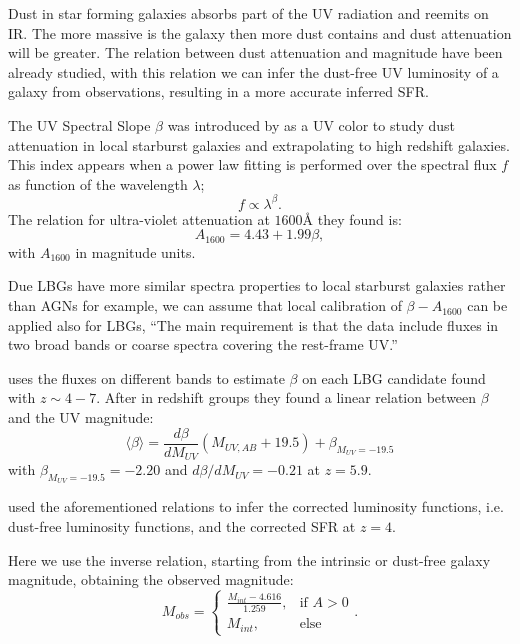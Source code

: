 \documentclass{emulateapj}
\begin{document}
Dust in star forming galaxies absorbs part of the UV radiation and reemits on IR. The more 
massive is the galaxy then more dust contains and dust attenuation will be greater. The 
relation between dust attenuation and magnitude have been already studied, with this relation 
we can infer the dust-free UV luminosity of a galaxy from observations, resulting in  a more 
accurate inferred SFR.

The UV Spectral Slope $\beta$ was introduced by \citet{Meurer99} as a UV color to 
study dust attenuation in local starburst galaxies and extrapolating to high redshift galaxies. 
This index appears when a power law fitting is performed over the spectral flux $f$ 
as function of the wavelength $\lambda$;
\[ f \propto \lambda^\beta.\]
The relation for ultra-violet attenuation at $1600 \textrm{\AA}$ they found is:
\begin{equation}
A_{1600} = 4.43 + 1.99 \beta,
\end{equation}
with $A_{1600}$ in magnitude units. 

Due LBGs have more similar spectra properties to local starburst galaxies rather than AGNs 
for example, we can assume that local calibration of $\beta-A_{1600}$ can be applied also 
for LBGs,
``The main requirement is that the data include fluxes in two broad bands or coarse spectra 
covering the rest-frame UV.''


\citet{Bouwens12} uses the fluxes on different bands to estimate $\beta$ on each LBG 
candidate found with $z \sim 4-7$. After in redshift groups they found a linear relation 
between $\beta$ and the UV magnitude:
\begin{equation}
\langle \beta \rangle = \frac{d \beta}{d M_{UV}} \left( M_{UV,AB}+19.5 \right) 
                                   + \beta_{M_{UV}=-19.5}
\end{equation}
with $ \beta_{M_{UV}=-19.5} = -2.20$ and $d \beta/d M_{UV} = -0.21$ at $z=5.9$.

\citet{Smit12} used the aforementioned relations to infer the corrected luminosity functions,
i.e. dust-free luminosity functions, and the corrected SFR at $z=4$. 

Here we use the inverse relation, starting from the intrinsic or dust-free galaxy magnitude, 
obtaining the observed magnitude:
\begin{equation}
  M_{obs} = \begin{cases} 
                         \frac{M_{int}-4.616}{1.259}, &\mbox{if } A>0 \\
                         M_{int}, &\mbox{else}
                   \end{cases}.
\label{eqn. dust attenuation}
\end{equation}
\end{document}
